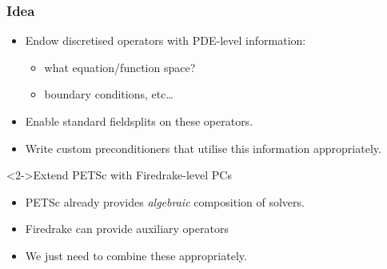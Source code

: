 \documentclass[presentation,aspectratio=43]{beamer}
\begin{document}
\begin{frame}
  \frametitle{Idea}
  \begin{itemize}
  \item Endow discretised operators with PDE-level information:
    \begin{itemize}
    \item what equation/function space?
    \item boundary conditions, etc\ldots
    \end{itemize}
  \item Enable standard fieldsplits on these operators.
  \item Write custom preconditioners that utilise this information appropriately.
  \end{itemize}
  \begin{block}<2->{Extend PETSc with Firedrake-level PCs}
  \begin{itemize}
  \item PETSc already provides \emph{algebraic} composition of solvers. \nocite{Brown:2012}

  \item Firedrake can provide auxiliary operators

  \item We just need to combine these appropriately.
  \end{itemize}
  \end{block}
\end{frame}
\end{document}
